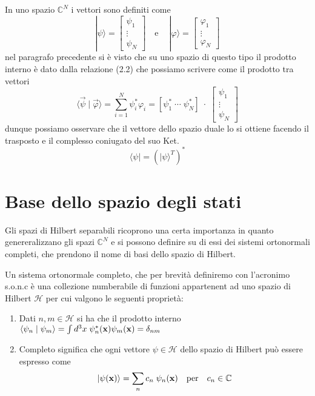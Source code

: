 \noindent In uno spazio $\mathbb{C}^N$ i vettori  sono definiti come 
\begin{equation*}
	 | \psi \rangle  = \left [ \begin{array}{c}
		\psi_1 \\
		 \vdots \\
		 \psi_N
	\end{array}\right ] \quad \text{e} \quad \
 |\varphi \rangle = \left [\begin{array}{c}
 	\varphi_1 \\
 	\vdots \\
 	\varphi_N 
 \end{array}\right ]
\end{equation*}  
nel paragrafo precedente si \`e visto che su uno spazio di questo tipo il prodotto interno \`e dato dalla relazione (2.2) che possiamo scrivere come il prodotto tra vettori
\begin{equation*}
	\langle \vec{\psi} \;|\; \vec{\varphi}\rangle = \sum_{i=1}^N \psi_i^*\varphi_i =  [ \psi_1^* \;\cdots \; \psi_N^* ] \;\cdot \; \left [\begin{array}{c}
		\psi_1 \\
		\vdots \\
		\psi_N
	\end{array}\right]
\end{equation*}
dunque possiamo osservare che il vettore dello spazio duale lo si ottiene facendo il trasposto e il complesso coniugato del suo Ket.
\begin{equation*}
	\langle \psi | = \left (|\psi \rangle^T \right)^*
\end{equation*}

\section{Base dello spazio degli stati}

Gli spazi di Hilbert separabili ricoprono una certa importanza in quanto genereralizzano gli spazi $\mathbb{C}^N$ e si possono definire su di essi dei sistemi ortonormali completi, che prendono il nome di basi dello spazio di Hilbert.
\newline

\noindent Un sistema ortonormale completo, che per brevit\`a definiremo con l'acronimo s.o.n.c \`e una collezione numberabile di funzioni appartenent ad uno spazio di Hilbert $\mathcal{H}$ per cui valgono le seguenti propriet\`a:
\begin{enumerate}
	\item Dati $n,m \in \mathcal{H}$ si ha che il prodotto interno $\langle \psi_n \; | \; \psi_m \rangle = \int d^3x \;\psi_n^*(\bold{x})\psi_m(\bold{x}) = \delta_{nm}$
	\item Completo significa che ogni vettore $\psi \in \mathcal{H}$ dello spazio di Hilbert pu\`o essere espresso come
	\begin{equation}
		|\psi(\bold{x}) \rangle = \sum_{n}c_n \; \psi_{n}(\bold{x}) \quad \text{per} \quad  c_n \in \mathbb{C} 
	\end{equation}
\end{enumerate} 

